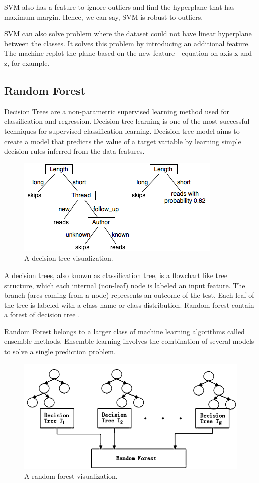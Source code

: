 \documentclass[journal]{IEEEtran}
\begin{document}
SVM also has a feature to ignore outliers and find the hyperplane that has maximum margin. Hence, we can say, SVM is robust to outliers.

SVM can also solve problem where the dataset could not have linear hyperplane between the classes. It solves this problem by introducing an additional feature. The machine replot the plane based on the new feature - equation on axis x and z, for example.

\subsection{Random Forest}
Decision Trees are a non-parametric supervised learning method used for classification and regression. Decision tree learning is one of the most successful techniques for supervised classification learning. Decision tree model aims to create a model that predicts the value of a target variable by learning simple decision rules inferred from the data features.	

\begin{figure}[!ht]
	\centering
	\includegraphics[scale=0.5]{tree}
	\caption{A decision tree visualization.}
\end{figure}

A decision trees, also known as classification tree, is a flowchart like tree structure, which each internal (non-leaf) node is labeled an input feature. The branch (arcs coming from a node) represents an outcome of the test. Each leaf of the tree is labeled with a class name or class distribution. Random forest contain a forest of decision tree \cite{Pedregosa2011-ac}.

Random Forest belongs to a larger class of machine learning algorithms called ensemble methods. Ensemble learning involves the combination of several models to solve a single prediction problem.

\begin{figure}[!ht]
	\centering
	\includegraphics[scale=0.2]{forest}
	\caption{A random forest visualization.}
\end{figure}
\end{document}
